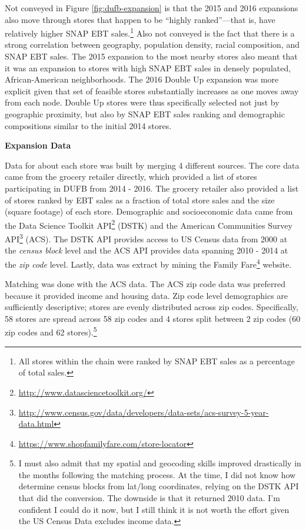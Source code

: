 \documentclass[12pt,letterpaperpaper,]{book}
\renewcommand{\href}[2]{#2\footnote{\url{#1}}}
\begin{document}
Not conveyed in Figure \ref{fig:dufb-expansion} is that the 2015 and
2016 expansions also move through stores that happen to be ``highly
ranked''---that is, have relatively higher SNAP EBT sales.\footnote{All
  stores within the chain were ranked by SNAP EBT sales as a percentage
  of total sales.} Also not conveyed is the fact that there is a strong
correlation between geography, population density, racial composition,
and SNAP EBT sales. The 2015 expansion to the most nearby stores also
meant that it was an expansion to stores with high SNAP EBT sales in
densely populated, African-American neighborhoods. The 2016 Double Up
expansion was more explicit given that set of feasible stores
substantially increases as one moves away from each node. Double Up
stores were thus specifically selected not just by geographic proximity,
but also by SNAP EBT sales ranking and demographic compositions similar
to the initial 2014 stores.

\textbf{Expansion Data}

Data for about each store was built by merging 4 different sources. The
core data came from the grocery retailer directly, which provided a list
of stores participating in DUFB from 2014 - 2016. The grocery retailer
also provided a list of stores ranked by EBT sales as a fraction of
total store sales and the size (square footage) of each store.
Demographic and socioeconomic data came from the
\href{http://www.datasciencetoolkit.org/}{Data Science Toolkit API}
(DSTK) and the
\href{http://www.census.gov/data/developers/data-sets/acs-survey-5-year-data.html}{American
Communities Survey API} (ACS). The DSTK API provides access to US Census
data from 2000 at the \emph{census block} level and the ACS API provides
data spanning 2010 - 2014 at the \emph{zip code} level. Lastly, data was
extract by mining the
\href{https://www.shopfamilyfare.com/store-locator}{Family Fare}
website.

Matching was done with the ACS data. The ACS zip code data was preferred
because it provided income and housing data. Zip code level demographics
are sufficiently descriptive; stores are evenly distributed across zip
codes. Specifically, 58 stores are spread across 58 zip codes and 4
stores split between 2 zip codes (60 zip codes and 62 stores).\footnote{I
  must also admit that my spatial and geocoding skills improved
  drastically in the months following the matching process. At the time,
  I did not know how determine census blocks from lat/long coordinates,
  relying on the DSTK API that did the conversion. The downside is that
  it returned 2010 data. I'm confident I could do it now, but I still
  think it is not worth the effort given the US Census Data excludes
  income data.}
\end{document}
